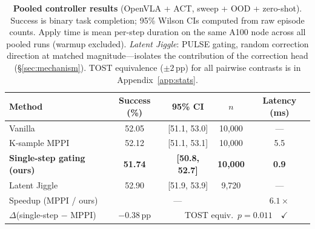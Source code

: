 \begin{table}[t]
\centering
\small
\caption{\textbf{Pooled controller results} (OpenVLA + ACT, sweep + OOD + zero-shot). Success is binary task completion; 95\% Wilson CIs computed from raw episode counts. Apply time is mean per-step duration on the same A100 node across all pooled runs (warmup excluded). \textit{Latent Jiggle}: PULSE gating, random correction direction at matched magnitude---isolates the contribution of the correction head (\S\ref{sec:mechanism}). TOST equivalence (${\pm}2$\,pp) for all pairwise contrasts is in Appendix~\ref{app:stats}.}
\label{tab:final_pooled_results}
\setlength{\tabcolsep}{4pt}
\begin{tabular}{lcccc}
\toprule
\textbf{Method} & \textbf{Success (\%)} & \textbf{95\% CI} & $n$ & \textbf{Latency (ms)} \\
\midrule
Vanilla & 52.05 & [51.1, 53.0] & 10{,}000 & --- \\
K-sample MPPI & 52.12 & [51.1, 53.1] & 10{,}000 & 5.5 \\
\textbf{Single-step gating (ours)} & \textbf{51.74} & \textbf{[50.8, 52.7]} & \textbf{10{,}000} & \textbf{0.9} \\
Latent Jiggle & 52.90 & [51.9, 53.9] & 9{,}720 & --- \\
\midrule
Speedup (MPPI / ours) & \multicolumn{3}{c}{---} & $\mathbf{6.1{\times}}$ \\
$\Delta$(single-step $-$ MPPI) & $-0.38$\,pp & \multicolumn{3}{c}{TOST equiv.\ $p{=}0.011$~~$\checkmark$} \\
\bottomrule
\end{tabular}
\end{table}

